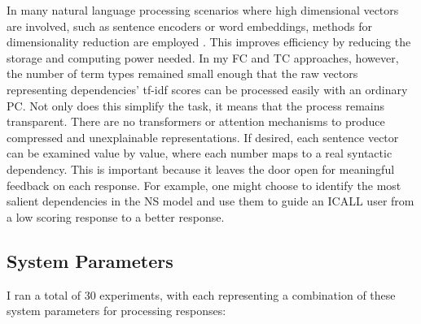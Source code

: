 In many natural language processing scenarios where high dimensional vectors are involved, such as sentence encoders or word embeddings, methods for dimensionality reduction are employed \citep{BertDevlin2018,word2vec}. This improves efficiency by reducing the storage and computing power needed. In my FC and TC approaches, however, the number of term types remained small enough that the raw vectors representing dependencies' tf-idf scores can be processed easily with an ordinary PC. Not only does this simplify the task, it means that the process remains transparent. There are no transformers or attention mechanisms to produce compressed and unexplainable representations.  If desired, each sentence vector can be examined value by value, where each number maps to a real syntactic dependency. This is important because it leaves the door open for meaningful feedback on each response. For example, one might choose to identify the most salient dependencies in the NS model and use them to guide an ICALL user from a low scoring response to a better response.

\subsection{System Parameters}
\label{sec:parameters}

I ran a total of 30 experiments, with each representing a combination of these system parameters for processing responses: 

